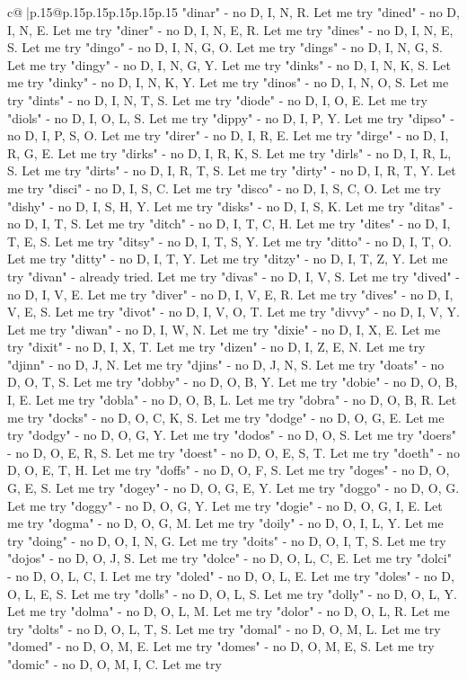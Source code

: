 \documentclass{article}
\begin{document}
{\begin{supertabular}{c@{$\;$}|p{.15\linewidth}@{}p{.15\linewidth}p{.15\linewidth}p{.15\linewidth}p{.15\linewidth}p{.15\linewidth}}
{{{"dinar" {-} no D, I, N, R. Let me try "dined" {-} no D, I, N, E. Let me try "diner" {-} no D, I, N, E, R. Let me try "dines" {-} no D, I, N, E, S. Let me try "dingo" {-} no D, I, N, G, O. Let me try "dings" {-} no D, I, N, G, S. Let me try "dingy" {-} no D, I, N, G, Y. Let me try "dinks" {-} no D, I, N, K, S. Let me try "dinky" {-} no D, I, N, K, Y. Let me try "dinos" {-} no D, I, N, O, S. Let me try "dints" {-} no D, I, N, T, S. Let me try "diode" {-} no D, I, O, E. Let me try "diols" {-} no D, I, O, L, S. Let me try "dippy" {-} no D, I, P, Y. Let me try "dipso" {-} no D, I, P, S, O. Let me try "direr" {-} no D, I, R, E. Let me try "dirge" {-} no D, I, R, G, E. Let me try "dirks" {-} no D, I, R, K, S. Let me try "dirls" {-} no D, I, R, L, S. Let me try "dirts" {-} no D, I, R, T, S. Let me try "dirty" {-} no D, I, R, T, Y. Let me try "disci" {-} no D, I, S, C. Let me try "disco" {-} no D, I, S, C, O. Let me try "dishy" {-} no D, I, S, H, Y. Let me try "disks" {-} no D, I, S, K. Let me try "ditas" {-} no D, I, T, S. Let me try "ditch" {-} no D, I, T, C, H. Let me try "dites" {-} no D, I, T, E, S. Let me try "ditsy" {-} no D, I, T, S, Y. Let me try "ditto" {-} no D, I, T, O. Let me try "ditty" {-} no D, I, T, Y. Let me try "ditzy" {-} no D, I, T, Z, Y. Let me try "divan" {-} already tried. Let me try "divas" {-} no D, I, V, S. Let me try "dived" {-} no D, I, V, E. Let me try "diver" {-} no D, I, V, E, R. Let me try "dives" {-} no D, I, V, E, S. Let me try "divot" {-} no D, I, V, O, T. Let me try "divvy" {-} no D, I, V, Y. Let me try "diwan" {-} no D, I, W, N. Let me try "dixie" {-} no D, I, X, E. Let me try "dixit" {-} no D, I, X, T. Let me try "dizen" {-} no D, I, Z, E, N. Let me try "djinn" {-} no D, J, N. Let me try "djins" {-} no D, J, N, S. Let me try "doats" {-} no D, O, T, S. Let me try "dobby" {-} no D, O, B, Y. Let me try "dobie" {-} no D, O, B, I, E. Let me try "dobla" {-} no D, O, B, L. Let me try "dobra" {-} no D, O, B, R. Let me try "docks" {-} no D, O, C, K, S. Let me try "dodge" {-} no D, O, G, E. Let me try "dodgy" {-} no D, O, G, Y. Let me try "dodos" {-} no D, O, S. Let me try "doers" {-} no D, O, E, R, S. Let me try "doest" {-} no D, O, E, S, T. Let me try "doeth" {-} no D, O, E, T, H. Let me try "doffs" {-} no D, O, F, S. Let me try "doges" {-} no D, O, G, E, S. Let me try "dogey" {-} no D, O, G, E, Y. Let me try "doggo" {-} no D, O, G. Let me try "doggy" {-} no D, O, G, Y. Let me try "dogie" {-} no D, O, G, I, E. Let me try "dogma" {-} no D, O, G, M. Let me try "doily" {-} no D, O, I, L, Y. Let me try "doing" {-} no D, O, I, N, G. Let me try "doits" {-} no D, O, I, T, S. Let me try "dojos" {-} no D, O, J, S. Let me try "dolce" {-} no D, O, L, C, E. Let me try "dolci" {-} no D, O, L, C, I. Let me try "doled" {-} no D, O, L, E. Let me try "doles" {-} no D, O, L, E, S. Let me try "dolls" {-} no D, O, L, S. Let me try "dolly" {-} no D, O, L, Y. Let me try "dolma" {-} no D, O, L, M. Let me try "dolor" {-} no D, O, L, R. Let me try "dolts" {-} no D, O, L, T, S. Let me try "domal" {-} no D, O, M, L. Let me try "domed" {-} no D, O, M, E. Let me try "domes" {-} no D, O, M, E, S. Let me try "domic" {-} no D, O, M, I, C. Let me try }}}
\end{supertabular}}
\end{document}
